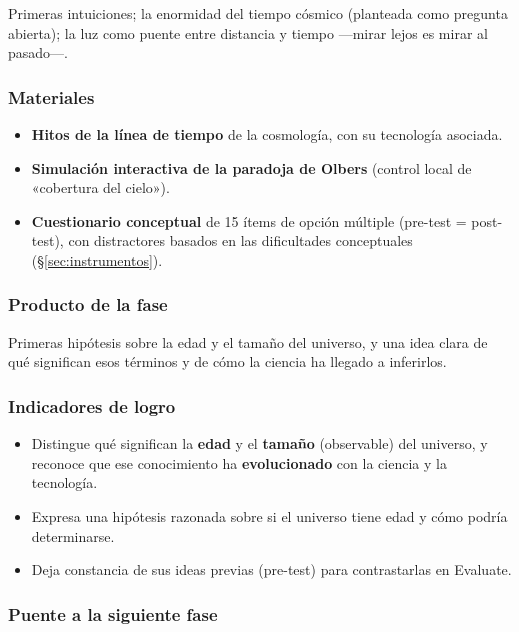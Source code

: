 Primeras intuiciones; la enormidad del tiempo cósmico (planteada como pregunta abierta); la luz como puente entre distancia y tiempo ---mirar lejos es mirar al pasado---.

\subsubsection*{Materiales}

\begin{itemize}
\item \textbf{Hitos de la línea de tiempo} de la cosmología, con su tecnología asociada.
\item \textbf{Simulación interactiva de la paradoja de Olbers} (control local de «cobertura del cielo»).
\item \textbf{Cuestionario conceptual} de 15 ítems de opción múltiple (pre-test = post-test), con distractores basados en las dificultades conceptuales (§\ref{sec:instrumentos}).
\end{itemize}

\subsubsection*{Producto de la fase}

Primeras hipótesis sobre la edad y el tamaño del universo, y una idea clara de qué significan esos términos y de cómo la ciencia ha llegado a inferirlos.

\subsubsection*{Indicadores de logro}

\begin{itemize}
\item Distingue qué significan la \textbf{edad} y el \textbf{tamaño} (observable) del universo, y reconoce que ese conocimiento ha \textbf{evolucionado} con la ciencia y la tecnología.
\item Expresa una hipótesis razonada sobre si el universo tiene edad y cómo podría determinarse.
\item Deja constancia de sus ideas previas (pre-test) para contrastarlas en Evaluate.
\end{itemize}

\subsubsection*{Puente a la siguiente fase}

